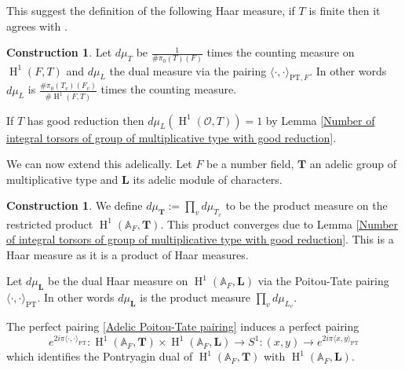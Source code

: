 \documentclass[a4paper,11pt,reqno]{amsart}
\newcommand{\A}{\mathbb{A}}
\DeclareMathOperator{\HH}{H}
\theoremstyle{definition}
\newtheorem{construction}[theorem]{Construction}
\begin{document}
This suggest the definition of the following Haar measure, if $T$ is finite then it agrees with \cite[Def.~3.1.2]{Darda2022Torsors}.
\begin{construction}
	Let $d\mu_{T}$ be $\frac{1}{\# \pi_0(T)(F)}$ times the counting measure on $\HH^1(F, T)$ and $d\mu_{L}$ the dual measure via the pairing $\langle \cdot, \cdot \rangle_{\text{PT}, F}$. In other words $d\mu_{L}$ is $\frac{\# \pi_0(T_v)(F_v)}{\# \HH^1(F, T)}$ times the counting measure.
	
	If $T$ has good reduction then $d\mu_{L}(\HH^1(\mathcal{O}, T)) = 1$ by Lemma \ref{Number of integral torsors of group of multiplicative type with good reduction}. 
	\label{Local measures on H^1}
\end{construction}

We can now extend this adelically. Let $F$ be a number field, $\mathbf{T}$ an adelic group of multiplicative type and $\mathbf{L}$ its adelic module of characters.
\begin{construction}\label{con:Tamagawa measures on adelic cohomology}
	We define $d\mu_{\mathbf{T}} := \prod_{v} d\mu_{T_v}$ to be the product measure on the restricted product $\HH^1(\A_F, \mathbf{T})$. This product converges due to Lemma \ref{Number of integral torsors of group of multiplicative type with good reduction}. This is a Haar measure as it is a product of Haar measures.
		
	Let $d\mu_{\mathbf{L}}$ be the dual Haar measure on $\HH^1(\A_F, \mathbf{L})$ via the Poitou-Tate pairing $\langle \cdot, \cdot \rangle_{\text{PT}}$. In other words $d \mu_{\mathbf{L}}$ is the product measure $\prod_v d \mu_{L_v}$.
\end{construction}

The perfect pairing \eqref{Adelic Poitou-Tate pairing} induces a perfect pairing 
\begin{equation*}
	e^{2 i \pi \langle \cdot, \cdot \rangle_{\text{PT}}}: \HH^1(\A_F, \mathbf{T}) \times \HH^1(\A_F, \mathbf{L}) \to S^1: (x,y) \to e^{2 i \pi \langle x, y \rangle_{\text{PT}}}
\end{equation*}
which identifies the Pontryagin dual of $\HH^1(\A_F, \mathbf{T})$ with $\HH^1(\A_F, \mathbf{L})$.
\end{document}
